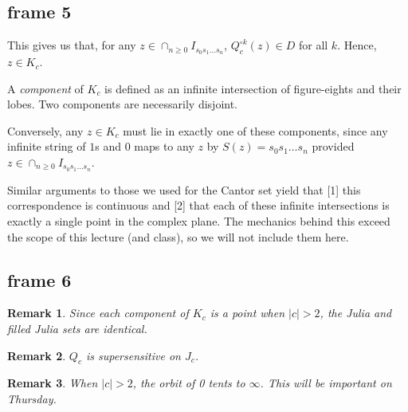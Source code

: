 \documentclass[xcolor=x11names,compress]{beamer}
\renewcommand{\(}{\begin{columns}}
\renewcommand{\)}{\end{columns}}
\newcommand{\<}[1]{\begin{column}{#1}}
\renewcommand{\>}{\end{column}}
\newtheorem{rmk}{Remark}
\begin{document}
\subsection{frame 5}
\begin{frame}

This gives us that, for any $z \in \cap_{n\ge 0} I_{s_0s_1\ldots s_n}$, $Q_c^{\circ k} (z) \in D$ for all $k$. Hence, $z \in K_c$.

\vspace{0.4cm}
\pause

A \textsl{component} of $K_c$ is defined as an infinite intersection of figure-eights and their lobes. Two components are necessarily disjoint.

\vspace{0.4cm}
\pause

Conversely, any $z \in K_c$ must lie in exactly one of these components, since any infinite string of $1$s and $0$
maps to any $z$ by $S(z) = s_0s_1\ldots s_n$ provided $z\in \cap_{n\ge 0} I_{s_0s_1 \ldots s_n}$.

\vspace{0.4cm}
\pause

Similar arguments to those we used for the Cantor set yield that [1] this correspondence is continuous and [2] that each of these infinite intersections is exactly a single point in the complex plane. The mechanics behind this exceed the scope of this lecture (and class), so we will not include them here.



\end{frame}




\subsection{frame 6}
\begin{frame}


\begin{rmk}
Since each component of $K_c$ is a point when $|c| > 2$, the Julia and filled Julia sets are identical.
\end{rmk}

\begin{rmk}
$Q_c$ is supersensitive on $J_c$.
\end{rmk}

\begin{rmk}
When $|c| > 2$, the orbit of 0 tents to $\infty$. This will be important on Thursday.
\end{rmk}

\end{frame}
\end{document}

